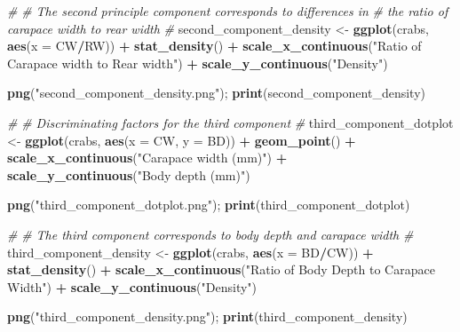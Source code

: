 \documentclass[11pt,]{article}
\newenvironment{Shaded}{\begin{snugshade}}{\end{snugshade}}
\newcommand{\CommentTok}[1]{\textcolor[rgb]{0.56,0.35,0.01}{\textit{#1}}}
\newcommand{\DataTypeTok}[1]{\textcolor[rgb]{0.13,0.29,0.53}{#1}}
\newcommand{\KeywordTok}[1]{\textcolor[rgb]{0.13,0.29,0.53}{\textbf{#1}}}
\newcommand{\NormalTok}[1]{#1}
\newcommand{\OperatorTok}[1]{\textcolor[rgb]{0.81,0.36,0.00}{\textbf{#1}}}
\newcommand{\StringTok}[1]{\textcolor[rgb]{0.31,0.60,0.02}{#1}}
\begin{document}
\begin{Shaded}
\begin{Highlighting}[]
\CommentTok{# }
\CommentTok{# The second principle component corresponds to differences in }
\CommentTok{# the ratio of carapace width to rear width}
\CommentTok{#}
\NormalTok{second_component_density <-}\StringTok{ }\KeywordTok{ggplot}\NormalTok{(crabs, }\KeywordTok{aes}\NormalTok{(}\DataTypeTok{x =}\NormalTok{ CW}\OperatorTok{/}\NormalTok{RW))                               }\OperatorTok{+}
\StringTok{        }\KeywordTok{stat_density}\NormalTok{()                                              }\OperatorTok{+}
\StringTok{        }\KeywordTok{scale_x_continuous}\NormalTok{(}\StringTok{"Ratio of Carapace width to Rear width"}\NormalTok{) }\OperatorTok{+}
\StringTok{        }\KeywordTok{scale_y_continuous}\NormalTok{(}\StringTok{"Density"}\NormalTok{)}

\KeywordTok{png}\NormalTok{(}\StringTok{"second_component_density.png"}\NormalTok{); }\KeywordTok{print}\NormalTok{(second_component_density)}

\CommentTok{#}
\CommentTok{# Discriminating factors for the third component}
\CommentTok{#}
\NormalTok{third_component_dotplot <-}\StringTok{ }\KeywordTok{ggplot}\NormalTok{(crabs, }\KeywordTok{aes}\NormalTok{(}\DataTypeTok{x =}\NormalTok{ CW, }\DataTypeTok{y =}\NormalTok{ BD))        }\OperatorTok{+}
\StringTok{        }\KeywordTok{geom_point}\NormalTok{()                              }\OperatorTok{+}
\StringTok{        }\KeywordTok{scale_x_continuous}\NormalTok{(}\StringTok{"Carapace width (mm)"}\NormalTok{) }\OperatorTok{+}
\StringTok{        }\KeywordTok{scale_y_continuous}\NormalTok{(}\StringTok{"Body depth (mm)"}\NormalTok{)}

\KeywordTok{png}\NormalTok{(}\StringTok{"third_component_dotplot.png"}\NormalTok{); }\KeywordTok{print}\NormalTok{(third_component_dotplot)}

\CommentTok{#}
\CommentTok{# The third component corresponds to body depth and carapace width}
\CommentTok{#}
\NormalTok{third_component_density <-}\StringTok{ }\KeywordTok{ggplot}\NormalTok{(crabs, }\KeywordTok{aes}\NormalTok{(}\DataTypeTok{x =}\NormalTok{ BD}\OperatorTok{/}\NormalTok{CW))                               }\OperatorTok{+}
\StringTok{        }\KeywordTok{stat_density}\NormalTok{()                                              }\OperatorTok{+}
\StringTok{        }\KeywordTok{scale_x_continuous}\NormalTok{(}\StringTok{"Ratio of Body Depth to Carapace Width"}\NormalTok{) }\OperatorTok{+}
\StringTok{        }\KeywordTok{scale_y_continuous}\NormalTok{(}\StringTok{"Density"}\NormalTok{)}

\KeywordTok{png}\NormalTok{(}\StringTok{"third_component_density.png"}\NormalTok{); }\KeywordTok{print}\NormalTok{(third_component_density)}



\end{Highlighting}
\end{Shaded}
\end{document}
